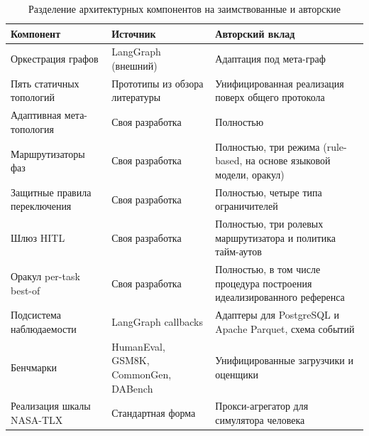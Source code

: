 \begin{table}[!htbp]
\caption{Разделение архитектурных компонентов на заимствованные
и авторские}
\label{tab:arch:contribution}
\small
\begin{tabularx}{\textwidth}{>{\raggedright\arraybackslash}p{4.0cm}
                              >{\raggedright\arraybackslash}p{3.8cm}
                              >{\raggedright\arraybackslash}X}
\toprule
\textbf{Компонент} & \textbf{Источник} & \textbf{Авторский вклад} \\
\midrule
Оркестрация графов        & LangGraph (внешний) & Адаптация под мета-граф \\
Пять статичных топологий  & Прототипы из обзора литературы &
                                                     Унифицированная
                                                     реализация поверх
                                                     общего протокола \\
Адаптивная мета-топология & Своя разработка    & Полностью \\
Маршрутизаторы фаз        & Своя разработка    & Полностью, три режима
                                                 (rule-based, на основе
                                                 языковой модели, оракул) \\
Защитные правила переключения & Своя разработка & Полностью, четыре типа
                                                 ограничителей \\
Шлюз HITL                 & Своя разработка    & Полностью, три ролевых
                                                 маршрутизатора и политика
                                                 тайм-аутов \\
Оракул per-task best-of   & Своя разработка    & Полностью, в том числе
                                                 процедура построения
                                                 идеализированного референса \\
Подсистема наблюдаемости  & LangGraph callbacks & Адаптеры для PostgreSQL
                                                 и Apache Parquet, схема
                                                 событий \\
Бенчмарки                 & HumanEval, GSM8K, CommonGen, DABench &
                                                 Унифицированные загрузчики
                                                 и оценщики \\
Реализация шкалы NASA-TLX & Стандартная форма  & Прокси-агрегатор для
                                                 симулятора человека \\
\bottomrule
\end{tabularx}
\end{table}

